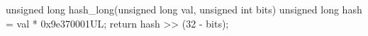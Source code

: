 \documentclass[varwidth=30.5em,crop]{standalone}
\begin{document}
\begin{ccode}
unsigned long hash_long(unsigned long val, unsigned int bits)
{
    unsigned long hash = val * 0x9e370001UL;
    return hash >> (32 - bits);
}
\end{ccode}
\end{document}
